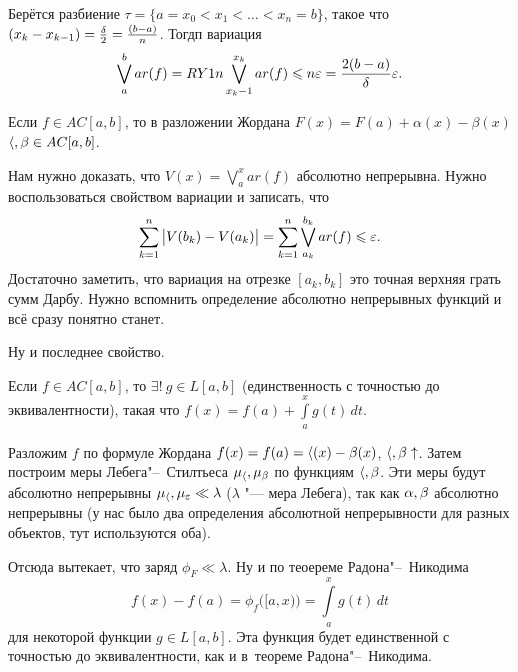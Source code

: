 \begin{Proof}
  Берётся разбиение $\tau = \{a=x_0<x_1<\dots<x_n=b\}$, такое что $(x_k-x_{k-1})=\frac{\delta}2 = \frac{(b-a)}n$. Тогдп вариация
  \[
\bigvee\limits_a^bar(f) = RY 1n\bigvee\limits_{x_k-1}^{x_k}ar(f)\leqslant n\varepsilon = \frac{2(b-a)}{\delta}\varepsilon.
\] 
\end{Proof}
\begin{Ut}
  Если $f\in AC[a,b]$, то в разложении Жордана $F(x) =F(a)+\alpha(x)-\beta(x)$ $\langle,\beta\in AC[a,b]$.
\end{Ut}
\begin{Proof}
 Нам нужно доказать, что $V(x) = \bigvee\limits_a^xar(f)$ абсолютно непрерывна. Нужно воспользоваться свойством вариации и записать, что
\[
  \sum\limits_{k = 1}^{n}  \big|V(b_k)-V(a_k)\big| = \sum\limits_{k = 1}^{n} \bigvee\limits_{a_k}^{b_k}ar(f)\leqslant\varepsilon.
\]
Достаточно заметить, что вариация на отрезке $[a_k,b_k]$ это точная верхняя грать сумм Дарбу. Нужно вспомнить определение абсолютно непрерывных функций и всё сразу понятно станет.
\end{Proof}

Ну и последнее свойство.
\begin{Ut}
  Если $f\in AC[a,b]$, то $\exists!\ g\in L[a,b]$ (единственность с точностью до эквивалентности), такая что $f(x) = f(a)+\int\limits_a^x g(t)\,dt$.
\end{Ut}
\begin{Proof}
  Разложим $f$ по формуле Жордана $f(x) = f(a) = \langle(x)-\beta(x)$, $\langle,\beta\uparrow$. Затем построим меры Лебега"--~Стилтьеса $\mu_\langle,\mu_\beta$ по функциям $\langle,\beta$. Эти меры будут абсолютно непрерывны $\mu_\langle,\mu_\varepsilon\ll\lambda$ ($\lambda$ "--- мера Лебега), так как $\alpha,\beta$ абсолютно непрерывны (у нас было два определения абсолютной непрерывности для разных объектов, тут используются оба).

Отсюда вытекает, что заряд $\phi_F\ll \lambda$. Ну и по теоереме Радона"--~Никодима 
\[
  f(x)-f(a) = \phi_f\big([a,x)\big)=\int\limits_a^xg(t)\,dt
\]
для некоторой функции $g\in L[a,b]$. Эта функция будет единственной с точностью до эквивалентности, как и в~теореме Радона"--~Никодима.
\end{Proof}


